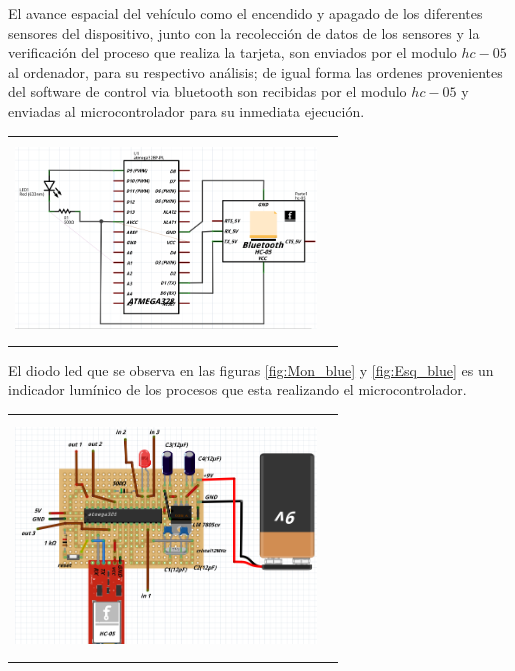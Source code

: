 \documentclass[12]{article}
\newenvironment{Figure}
{\par\medskip\noindent\minipage{\linewidth}}
{\endminipage\par\medskip}
\begin{document}
\begin{multicols}{2}
\begin{Figure}
\begin{tabular}{|l|r|}
\end{tabular}
\label{fig:Mon_blue}
\end{Figure}
El avance espacial del vehículo como el encendido y apagado de los diferentes sensores del dispositivo, junto con la recolección de datos de los sensores y la verificación del proceso que realiza la tarjeta, son enviados por el modulo $hc -05$ al ordenador, para su respectivo análisis; de igual forma las ordenes provenientes del software de control via bluetooth son recibidas por el modulo $hc-05$ y enviadas al microcontrolador para su inmediata ejecución. \\
\begin{Figure}
\center
\begin{tabular}{|l|r|}
\hline
\\
\includegraphics[width=8cm, height=5cm]{img/G3.png}  \\\\ \hline
\end{tabular}
\label{fig:Esq_blue}
\end{Figure}
El diodo led que se observa en las figuras  \ref{fig:Mon_blue} y \ref{fig:Esq_blue} es un indicador lumínico de los procesos que esta realizando el microcontrolador. 
\begin{Figure}
\center
\begin{tabular}{|l|r|}
\hline
\\
\includegraphics[width=8cm, height=6cm]{img/F6.png}  \\\\ \hline

\end{tabular}
\end{Figure}
\end{multicols}
\end{document}
